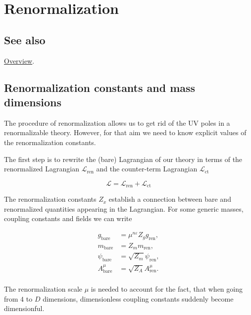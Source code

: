 \documentclass[../FeynCalcManual.tex]{subfiles}
\begin{document}
\hypertarget{renormalization}{
\section{Renormalization}\label{renormalization}}

\subsection{See also}

\hyperlink{toc}{Overview}.

\subsection{Renormalization constants and mass
dimensions}\label{renormalization-constants-and-mass-dimensions}

The procedure of renormalization allows us to get rid of the UV poles in
a renormalizable theory. However, for that aim we need to know explicit
values of the renormalization constants.

The first step is to rewrite the (bare) Lagrangian of our theory in
terms of the renormalized Lagrangian \(\mathcal{L}_{\textrm{ren}}\) and
the counter-term Lagrangian \(\mathcal{L}_{\textrm{ct}}\)

\begin{equation}
\mathcal{L}  = \mathcal{L}_{\textrm{ren}} + \mathcal{L}_{\textrm{ct}}
\end{equation}

The renormalization constants \(Z_x\) establish a connection between
bare and renormalized quantities appearing in the Lagrangian. For some
generic masses, coupling constants and fields we can write

\begin{align*}
g_{\textrm{bare}} &=  \mu^{n \varepsilon} Z_g g_{\textrm{ren}}, \\
m_{\textrm{bare}} &=  Z_m m_{\textrm{ren}}, \\
\psi_{\textrm{bare}} &=  \sqrt{Z_m} \psi_{\textrm{ren}}, \\
A^\mu_{\textrm{bare}} &=  \sqrt{Z_A} A^\mu_{\textrm{ren}}. \\
\end{align*}

The renormalization scale \(\mu\) is needed to account for the fact,
that when going from \(4\) to \(D\) dimensions, dimensionless coupling
constants suddenly become dimensionful.
\end{document}
